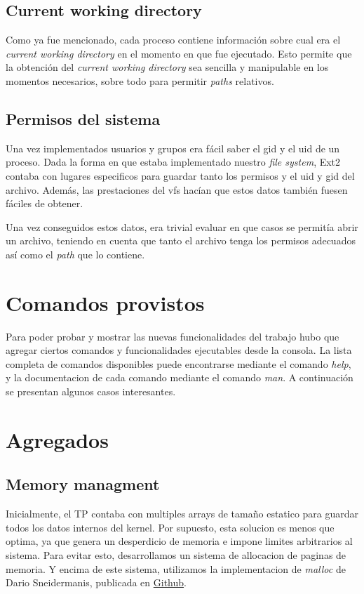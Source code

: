 \documentclass[a4paper,10pt]{article}
\begin{document}
\subsection{Current working directory}
    
Como ya fue mencionado, cada proceso contiene información sobre cual era el \textit{current working directory} en
el momento en que fue ejecutado. Esto permite que la obtención del \textit{current working directory} sea sencilla
y manipulable en los momentos necesarios, sobre todo para permitir \textit{paths} relativos.

    
\subsection{Permisos del sistema}
Una vez implementados usuarios y grupos era fácil saber el gid y el uid de un proceso. Dada la forma en que estaba
implementado nuestro \textit{file system}, Ext2 contaba con lugares especificos para guardar tanto los permisos y el
uid y gid del archivo. Además, las prestaciones del vfs hacían que estos datos también fuesen fáciles de obtener.

Una vez conseguidos estos datos, era trivial evaluar en que casos se permitía abrir un archivo, teniendo en cuenta
que tanto el archivo tenga los permisos adecuados así como el \textit{path} que lo contiene.

\newpage
\section{Comandos provistos}
Para poder probar y mostrar las nuevas funcionalidades del trabajo hubo que agregar ciertos comandos y funcionalidades ejecutables desde la consola. 
La lista completa de comandos disponibles puede encontrarse mediante el comando \textit{help}, y la documentacion de cada comando mediante el comando \textit{man}.
A continuación se presentan algunos casos interesantes.

\newpage
\section{Agregados}
\subsection{Memory managment}
Inicialmente, el TP contaba con multiples arrays de tamaño estatico para guardar todos los datos internos del kernel.
Por supuesto, esta solucion es menos que optima, ya que genera un desperdicio de memoria e impone limites arbitrarios al sistema.
Para evitar esto, desarrollamos un sistema de allocacion de paginas de memoria.
Y encima de este sistema, utilizamos la implementacion de \textit{malloc} de Dario Sneidermanis, publicada en \href{https://github.com/esneider/malloc}{Github}.
\end{document}
